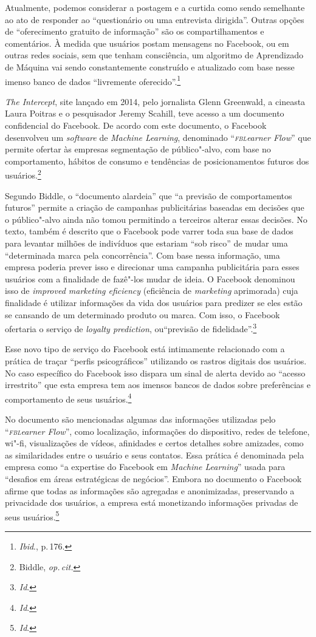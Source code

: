 Atualmente, podemos considerar a postagem e a curtida como sendo
semelhante ao ato de responder ao ``questionário ou uma entrevista
dirigida''. Outras opções de ``oferecimento gratuito de informação'' são
os compartilhamentos e comentários. À medida que usuários postam
mensagens no Facebook, ou em outras redes sociais, sem que tenham
consciência, um algoritmo de Aprendizado de Máquina vai sendo
constantemente construído e atualizado com base nesse imenso banco de
dados ``livremente oferecido''.\footnote{\textit{Ibid}., p.\,176.}

\emph{The Intercept}, site lançado em 2014, pelo jornalista Glenn
Greenwald, a cineasta Laura Poitras e o pesquisador Jeremy Scahill, teve
acesso a um documento confidencial do Facebook. De acordo com este
documento, o Facebook desenvolveu um \emph{software} de \emph{Machine
Learning}, denominado ``\emph{\textsc{fbl}earner Flow}'' que permite ofertar às
empresas segmentação de público"-alvo, com base no comportamento,
hábitos de consumo e tendências de posicionamentos futuros dos usuários.\footnote{Biddle, \textit{op.\,cit.}}

Segundo Biddle, o ``documento alardeia'' que ``a previsão de
comportamentos futuros'' permite a criação de campanhas publicitárias
baseadas em decisões que o público"-alvo ainda não tomou permitindo a
terceiros alterar essas decisões. No texto, também é descrito que o
Facebook pode varrer toda sua base de dados para levantar milhões de
indivíduos que estariam ``sob risco'' de mudar uma ``determinada marca
pela concorrência''. Com base nessa informação, uma empresa poderia
prever isso e direcionar uma campanha publicitária para esses usuários
com a finalidade de fazê"-los mudar de ideia.
O Facebook denominou isso de \emph{improved marketing eficiency} (eficiência de \emph{marketing}
aprimorada) cuja finalidade é utilizar informações da vida dos usuários
para predizer se eles estão se cansando de um determinado produto ou
marca. Com isso, o Facebook ofertaria o serviço de \emph{loyalty
prediction}, ou``previsão de fidelidade''.\footnote{\textit{Id}.}

Esse novo tipo de serviço do Facebook está intimamente relacionado com a
prática de traçar ``perfis psicográficos'' utilizando os rastros
digitais dos usuários. No caso específico do Facebook isso dispara um
sinal de alerta devido ao ``acesso irrestrito'' que esta empresa tem aos
imensos bancos de dados sobre preferências e comportamento de seus
usuários.\footnote{\textit{Id}.}

No documento são mencionadas algumas das informações utilizadas pelo
``\emph{\textsc{fbl}earner Flow}'', como localização, informações do dispositivo,
redes de telefone, wi"-fi, visualizações de vídeos, afinidades e certos
detalhes sobre amizades, como as similaridades entre o usuário e seus
contatos. Essa prática é denominada pela empresa como ``a expertise do
Facebook em \emph{Machine Learning}'' usada para ``desafios em áreas
estratégicas de negócios''. Embora no documento o Facebook afirme que
todas as informações são agregadas e anonimizadas, preservando a
privacidade dos usuários, a empresa está monetizando informações
privadas de seus usuários.\footnote{\textit{Id}.}

